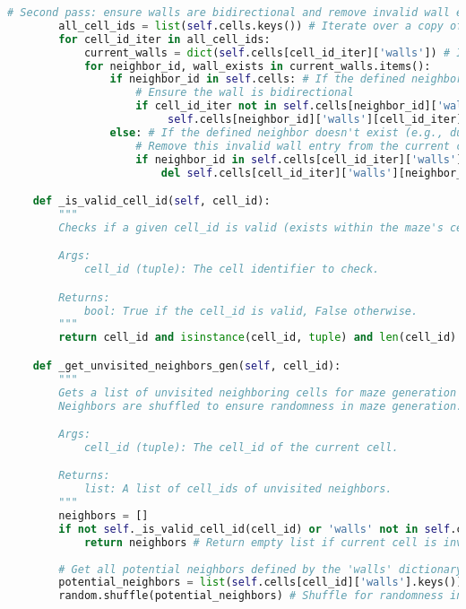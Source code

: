 \documentclass[UTF8]{report}
\theoremstyle{MyLineTheoremStyle} %
\theoremstyle{MyBlockTheoremStyle} %
\theoremstyle{MySubsubsectionStyle} %
\begin{document}
\begin{lstlisting}[language=Python, caption={迷宫生成与求解程序代码}]
        # Second pass: ensure walls are bidirectional and remove invalid wall entries
        all_cell_ids = list(self.cells.keys()) # Iterate over a copy of keys if modifying dict
        for cell_id_iter in all_cell_ids: 
            current_walls = dict(self.cells[cell_id_iter]['walls']) # Iterate over a copy of this cell's walls
            for neighbor_id, wall_exists in current_walls.items():
                if neighbor_id in self.cells: # If the defined neighbor actually exists
                    # Ensure the wall is bidirectional
                    if cell_id_iter not in self.cells[neighbor_id]['walls']:
                         self.cells[neighbor_id]['walls'][cell_id_iter] = True
                else: # If the defined neighbor doesn't exist (e.g., due to boundary conditions in initial setup)
                    # Remove this invalid wall entry from the current cell
                    if neighbor_id in self.cells[cell_id_iter]['walls']:
                        del self.cells[cell_id_iter]['walls'][neighbor_id]

    def _is_valid_cell_id(self, cell_id):
        """
        Checks if a given cell_id is valid (exists within the maze's cells).

        Args:
            cell_id (tuple): The cell identifier to check.

        Returns:
            bool: True if the cell_id is valid, False otherwise.
        """
        return cell_id and isinstance(cell_id, tuple) and len(cell_id) == 2 and cell_id in self.cells

    def _get_unvisited_neighbors_gen(self, cell_id):
        """
        Gets a list of unvisited neighboring cells for maze generation (Randomized DFS).
        Neighbors are shuffled to ensure randomness in maze generation.

        Args:
            cell_id (tuple): The cell_id of the current cell.

        Returns:
            list: A list of cell_ids of unvisited neighbors.
        """
        neighbors = []
        if not self._is_valid_cell_id(cell_id) or 'walls' not in self.cells[cell_id]:
            return neighbors # Return empty list if current cell is invalid or has no wall data
            
        # Get all potential neighbors defined by the 'walls' dictionary keys
        potential_neighbors = list(self.cells[cell_id]['walls'].keys())
        random.shuffle(potential_neighbors) # Shuffle for randomness in choosing the next cell


\end{lstlisting}
\end{document}

